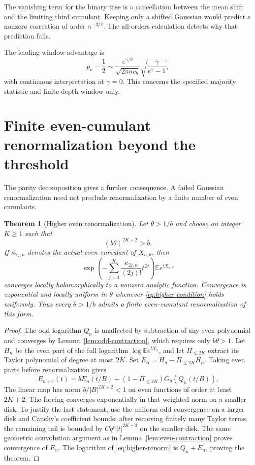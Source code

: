 \documentclass[11pt]{article}
\newtheorem{theorem}{Theorem}[section]
\theoremstyle{definition}
\newcommand{\E}{\mathbb E}
\begin{document}
The vanishing term for the binary tree is a cancellation between the
mean shift and the limiting third cumulant. Keeping only a shifted
Gaussian would predict a nonzero correction of order $n^{-3/2}$.
The all-orders calculation detects why that prediction fails.

The leading window advantage is
\[
 p_n-\frac12\sim
 \frac{e^{\gamma/2}}{\sqrt{2\pi n c_b}}
          \sqrt{\frac{\gamma}{e^\gamma-1}},
\]
with continuous interpretation at $\gamma=0$. This concerns the
specified majority statistic and finite-depth window only.

\section{Finite even-cumulant renormalization beyond the threshold}

The parity decomposition gives a further consequence. A failed
Gaussian renormalization need not preclude renormalization by a finite
number of even cumulants.

\begin{theorem}[Higher even renormalization]\label{thm:higher}
Let $\theta>1/b$ and choose an integer $K\geq1$ such that
\begin{equation}\label{eq:higher-condition}
                         (b\theta)^{2K+2}>b.
\end{equation}
If $\kappa_{2j,n}$ denotes the actual even cumulant of
$X_{n,\theta}$, then
\begin{equation}\label{eq:higher-renorm}
 \exp\!\left(-\sum_{j=1}^{K}
             \frac{\kappa_{2j,n}}{(2j)!}t^{2j}\right)
                  \E e^{tX_{n,\theta}}
\end{equation}
converges locally holomorphically to a nonzero analytic function.
Convergence is exponential and locally uniform in $\theta$ whenever
\eqref{eq:higher-condition} holds uniformly. Thus every $\theta>1/b$
admits a finite even-cumulant renormalization of this form.
\end{theorem}

\begin{proof}
The odd logarithm $Q_n$ is unaffected by subtraction of any even
polynomial and converges by Lemma~\ref{lem:odd-contraction}, which
requires only $b\theta>1$. Let $H_n$ be the even part of the full
logarithm $\log\E e^{tX_n}$, and let $\Pi_{\leq2K}$ extract its
Taylor polynomial of degree at most $2K$. Set
$E_n=H_n-\Pi_{\leq2K}H_n$. Taking even parts before renormalization
gives
\[
 E_{n+1}(t)=bE_n(t/B)
    +(1-\Pi_{\leq2K})G_\theta(Q_n(t/B)).
\]
The linear map has norm $b/|B|^{2K+2}<1$ on even functions of order
at least $2K+2$. The forcing converges exponentially in that weighted
norm on a smaller disk. To justify the last statement, use the
uniform odd convergence on a larger disk and Cauchy's coefficient
bounds: after removing finitely many Taylor terms, the remaining tail
is bounded by $Cq^n|t|^{2K+2}$ on the smaller disk. The same geometric
convolution argument as in Lemma~\ref{lem:even-contraction} proves
convergence of $E_n$. The logarithm of \eqref{eq:higher-renorm} is
$Q_n+E_n$, proving the theorem.
\end{proof}
\end{document}
